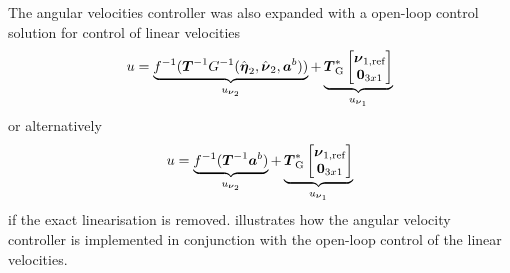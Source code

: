 The angular velocities \abbrPI controller was also expanded with a open-loop control solution for control of linear velocities
\begin{equation}
	u = \underbrace{f^{-1}(\boldsymbol{T}^{-1} G^{-1}(\hat{\etaVector}_2,\hat{\nuVector}_2,\accVector^b))}_{u_{\nuVectorAng}} + \underbrace{\thrusterGeometryOnes[*] \begin{bmatrix}\nuVector_{1,\text{ref}} \\ \zeroCol{3} \end{bmatrix}}_{u_{\nuVectorLin}}	
\end{equation}
or alternatively 
\begin{equation}
	u = \underbrace{f^{-1}(\boldsymbol{T}^{-1} \accVector^b)}_{u_{\nuVectorAng}} + \underbrace{\thrusterGeometryOnes[*] \begin{bmatrix} \nuVector_{1,\text{ref}} \\ \zeroCol{3} \end{bmatrix}}_{u_{\nuVectorLin}}
\end{equation}
if the exact linearisation is removed.  illustrates how the angular velocity controller is implemented in conjunction with the open-loop control of the linear velocities.
